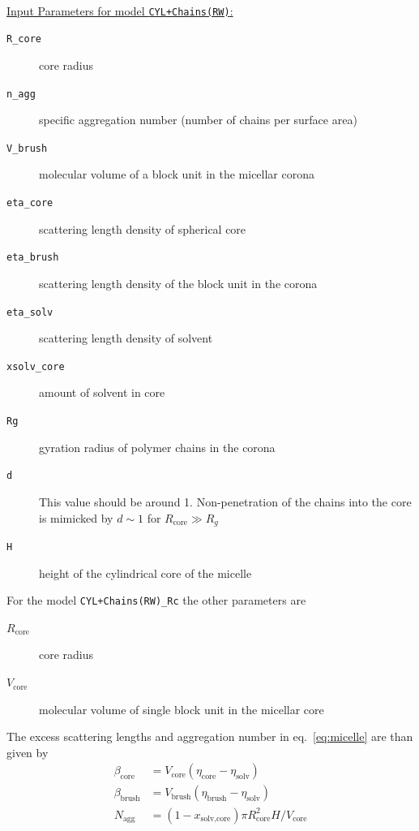 \hspace{1pt}\\
\uline{Input Parameters for model \texttt{CYL+Chains(RW)}:}
\begin{description}
\item[\texttt{R\_core}] core radius
\item[\texttt{n\_agg}] specific aggregation number (number of chains per surface area)
\item[\texttt{V\_brush}]  molecular volume of a block unit in the micellar corona
\item[\texttt{eta\_core}] scattering length density of spherical core
\item[\texttt{eta\_brush}] scattering length density of the block unit in the corona
\item[\texttt{eta\_solv}] scattering length density of solvent
\item[\texttt{xsolv\_core}] amount of solvent in core
\item[\texttt{Rg}] gyration radius of polymer chains in the corona
\item[\texttt{d}] This value should be around 1. Non-penetration of the chains
into the core is mimicked by $d\sim 1$ for $R_\text{core}\gg R_g$
\item[\texttt{H}] height of the cylindrical core of the micelle
\end{description}

\vspace{10mm}

\noindent
For the model \texttt{CYL+Chains(RW)\_Rc} the other parameters are
\begin{description}
\item[$R_\text{core}$] core radius
\item[$V_\text{core}$] molecular volume of single block unit in the micellar core
\end{description}
The excess scattering lengths and aggregation number in eq.\
\ref{eq:micelle} are than given by
\begin{align}
\beta_\text{core}  &= V_\text{core}  (\eta_\text{core} -\eta_\text{solv}) \\
\beta_\text{brush} &= V_\text{brush} (\eta_\text{brush}-\eta_\text{solv}) \\
N_\text{agg} &= (1-x_\text{solv,core}) \pi  R_\text{core}^2 H  / V_\text{core}
\end{align}

